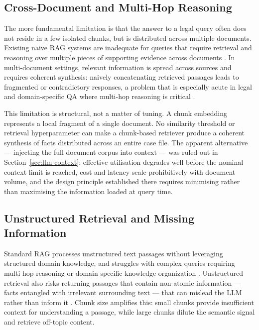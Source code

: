 \subsection{Cross-Document and Multi-Hop Reasoning}

The more fundamental limitation is that the answer to a legal query often does not
reside in a few isolated chunks, but is distributed across multiple documents.
Existing naive RAG systems are inadequate for queries that require retrieval and
reasoning over multiple pieces of supporting evidence across documents
\cite{tang2024multihoprag}. In multi-document settings, relevant information is spread
across sources and requires coherent synthesis: naively concatenating retrieved passages
leads to fragmented or contradictory responses, a problem that is especially acute in
legal and domain-specific QA where multi-hop reasoning is critical
\cite{liang2025reasoningrag12}.

This limitation is structural, not a matter of tuning. A chunk embedding represents a
local fragment of a single document. No similarity threshold or retrieval hyperparameter
can make a chunk-based retriever produce a coherent synthesis of facts distributed across
an entire case file. The apparent alternative --- injecting the full document corpus into
context --- was ruled out in Section~\ref{sec:llm-context}: effective utilisation degrades
well before the nominal context limit is reached, cost and latency scale prohibitively with
document volume, and the design principle established there requires minimising rather than
maximising the information loaded at query time.

\subsection{Unstructured Retrieval and Missing Information}

Standard RAG processes unstructured text passages without leveraging structured domain
knowledge, and struggles with complex queries requiring multi-hop reasoning or
domain-specific knowledge organization \cite{Jiang_2025}. Unstructured retrieval also
risks returning passages that contain non-atomic information --- facts entangled with
irrelevant surrounding text --- that can mislead the LLM rather than inform it
\cite{Jiang_2025}. Chunk size amplifies this: small chunks provide insufficient
context for understanding a passage, while large chunks dilute the semantic signal and
retrieve off-topic content.

